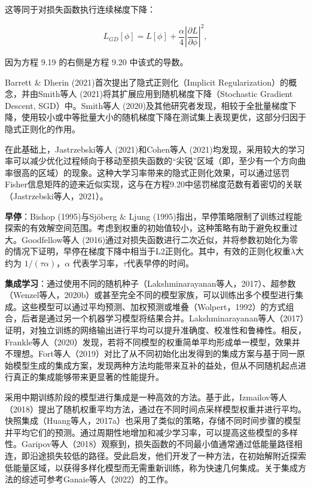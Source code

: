 \documentclass[lang=cn,newtx,10pt,scheme=chinese]{elegantbook}
\begin{document}
这等同于对损失函数执行连续梯度下降：

\begin{equation}
L_{GD}[\phi] = L[\phi] + \frac{\alpha}{4} \left| \frac{\partial L}{\partial \phi} \right|^2 , 
\end{equation}

因为方程 9.19 的右侧是方程 9.20 中该式的导数。

Barrett \& Dherin (2021)首次提出了隐式正则化（Implicit Regularization）的概念，并由Smith等人 (2021)将其扩展应用到随机梯度下降（Stochastic Gradient Descent, SGD）中。Smith等人 (2020)及其他研究者发现，相较于全批量梯度下降，使用较小或中等批量大小的随机梯度下降在测试集上表现更优，这部分归因于隐式正则化的作用。

在此基础上，Jastrzebski等人 (2021)和Cohen等人 (2021)均发现，采用较大的学习率可以减少优化过程倾向于移动至损失函数的“尖锐”区域（即，至少有一个方向曲率很高的区域）的现象。这种大学习率带来的隐式正则化效果，可以通过惩罚Fisher信息矩阵的迹来近似实现，这与在方程9.20中惩罚梯度范数有着密切的关联（Jastrzebski等人，2021）。

\textbf{早停}：Bishop (1995)与Sjöberg \& Ljung (1995)指出，早停策略限制了训练过程能探索的有效解空间范围。考虑到权重的初始值较小，这种策略有助于避免权重过大。Goodfellow等人 (2016)通过对损失函数进行二次近似，并将参数初始化为零的情况下证明，早停在梯度下降中相当于L2正则化。其中，有效的正则化权重\(\lambda\)大约为 \(1/(\tau\alpha)\)，\(\alpha\) 代表学习率，\(\tau\)代表早停的时间。

\textbf{集成学习}：通过使用不同的随机种子（Lakshminarayanan等人，2017）、超参数（Wenzel等人，2020b）或甚至完全不同的模型家族，可以训练出多个模型进行集成。这些模型可以通过平均预测、加权预测或堆叠（Wolpert，1992）的方式组合，后者是通过另一个机器学习模型将结果合并。Lakshminarayanan等人（2017）证明，对独立训练的网络输出进行平均可以提升准确度、校准性和鲁棒性。相反，Frankle等人（2020）发现，若将不同模型的权重简单平均形成单一模型，效果并不理想。Fort等人（2019）对比了从不同初始化出发得到的集成方案与基于同一原始模型生成的集成方案，发现两种方法均能带来互补的益处，但从不同随机起点进行真正的集成能够带来更显著的性能提升。

采用中期训练阶段的模型进行集成是一种高效的方法。基于此，Izmailov等人（2018）提出了随机权重平均方法，通过在不同时间点采样模型权重并进行平均。快照集成（Huang等人，2017a）也采用了类似的策略，存储不同时间步骤的模型并平均它们的预测。通过周期性地增加和减少学习率，可以提高这些模型的多样性。Garipov等人（2018）观察到，损失函数的不同最小值通常通过低能量路径相连，即沿途损失较低的路径。受此启发，他们开发了一种方法，在初始解附近探索低能量区域，以获得多样化模型而无需重新训练，称为快速几何集成。关于集成方法的综述可参考Ganaie等人（2022）的工作。
\end{document}
